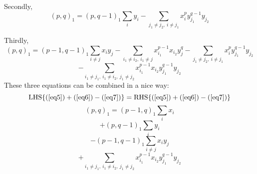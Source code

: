 \noindent Secondly, 
\begin{equation}
\label{eq6}
(p,q)_{1} = 
  (p,q-1)_{1} \sum_{i} y_{i}  	-  
  \sum_{j_{1} \neq j_{2},\ i \neq j_{1}} x_{i}^{p} y_{j_{1}}^{q-1} y_{j_{2}}
\end{equation}

\noindent Thirdly, 
\begin{equation}
\label{eq7}
(p,q)_{1} = 
   (p-1,q-1)_{1}	\sum_{i \neq j} x_{i} y_{j}  - 
   \sum_{i_{1} \neq i_{2},\ i_{1} \neq j} x_{i_{1}}^{p-1} x_{i_{2}}  y_{j}^{q} 	-
   \sum_{j_{1} \neq j_{2},\ i \neq j_{1}} x_{i}^{p} y_{j_{1}}^{q-1} y_{j_{2}}
\end{equation}
\[
	- \sum_{i_{1} \neq j_{1},\ i_{1} \neq i_{2},\ j_{1} \neq j_{2}} 
	x_{i_{1}}^{p-1} x_{i_{2}} y_{j_{1}}^{q-1} y_{j_{2}}
\]
%
These three equations can be combined in a nice way:
\[ \mbox{LHS}\{(\ref{eq5}) + (\ref{eq6}) - (\ref{eq7})\} = 
   \mbox{RHS}\{(\ref{eq5}) + (\ref{eq6}) - (\ref{eq7})\} \]
\[  (p,q)_{1} = 
   (p-1,q)_{1}	\sum_{i} x_{i} 
\]
\[ + (p,q-1)_{1}	\sum_{i} y_{i}  \]
\[ - (p-1,q-1)_{1} \sum_{i \neq j} x_{i} y_{j} \]
\[ + \sum_{i_{1} \neq j_{1},\ i_{1} \neq i_{2},\ j_{1} \neq j_{2}} 
	x_{i_{1}}^{p-1} x_{i_{2}} y_{j_{1}}^{q-1} y_{j_{2}}
\]

